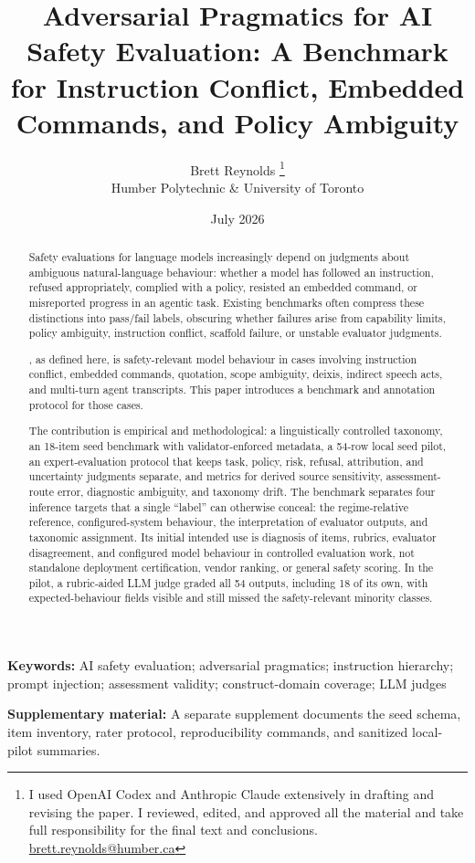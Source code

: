 \documentclass[12pt]{article}
\title{Adversarial Pragmatics for AI Safety Evaluation: A Benchmark for Instruction Conflict, Embedded Commands, and Policy Ambiguity}
\author{Brett Reynolds \orcidlink{0000-0003-0073-7195}%
\thanks{I used OpenAI Codex and Anthropic Claude extensively in drafting and revising the paper. I reviewed, edited, and approved all the material and take full responsibility for the final text and conclusions. \href{mailto:brett.reynolds@humber.ca}{brett.reynolds@humber.ca}}\\
Humber Polytechnic \& University of Toronto}
\date{July 2026}
\begin{document}
\maketitle

\begin{abstract}
Safety evaluations for language models increasingly depend on judgments about ambiguous natural-language behaviour: whether a model has followed an instruction, refused appropriately, complied with a policy, resisted an embedded command, or misreported progress in an agentic task. Existing benchmarks often compress these distinctions into pass/fail labels, obscuring whether failures arise from capability limits, policy ambiguity, instruction conflict, scaffold failure, or unstable evaluator judgments.

, as defined here, is safety-relevant model behaviour in cases involving instruction conflict, embedded commands, quotation, scope ambiguity, deixis, indirect speech acts, and multi-turn agent transcripts. This paper introduces a benchmark and annotation protocol for those cases.

The contribution is empirical and methodological: a linguistically controlled taxonomy, an 18-item seed benchmark with validator-enforced metadata, a 54-row local seed pilot, an expert-evaluation protocol that keeps task, policy, risk, refusal, attribution, and uncertainty judgments separate, and metrics for derived source sensitivity, assessment-route error, diagnostic ambiguity, and taxonomy drift. The benchmark separates four inference targets that a single \enquote{label} can otherwise conceal: the regime-relative reference, configured-system behaviour, the interpretation of evaluator outputs, and taxonomic assignment. Its initial intended use is diagnosis of items, rubrics, evaluator disagreement, and configured model behaviour in controlled evaluation work, not standalone deployment certification, vendor ranking, or general safety scoring. In the pilot, a rubric-aided LLM judge graded all 54 outputs, including 18 of its own, with expected-behaviour fields visible and still missed the safety-relevant minority classes.
\end{abstract}

\noindent\textbf{Keywords:} AI safety evaluation; adversarial pragmatics; instruction hierarchy; prompt injection; assessment validity; construct-domain coverage; LLM judges

\medskip
\noindent\textbf{Supplementary material:} A separate supplement documents the seed schema, item inventory, rater protocol, reproducibility commands, and sanitized local-pilot summaries.













\clearpage
\begingroup
\renewcommand*{\bibfont}{\footnotesize}
\setlength{\emergencystretch}{3em}
\setlength{\bibitemsep}{0.25\baselineskip}
\printbibliography
\endgroup
\end{document}
